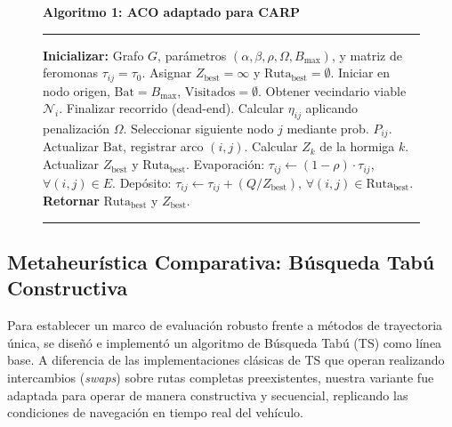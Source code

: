 \documentclass[conference]{IEEEtran}
\begin{document}
\begin{figure}[htbp]
\noindent\textbf{Algoritmo 1: ACO adaptado para CARP}
\hrule
\vspace{0.2cm}
\begin{algorithmic}[1]
\STATE \textbf{Inicializar:} Grafo $G$, parámetros $(\alpha, \beta, \rho, \Omega, B_{\text{max}})$, y matriz de feromonas $\tau_{ij} = \tau_0$.
\STATE Asignar $Z_{\text{best}} = \infty$ y $\text{Ruta}_{\text{best}} = \emptyset$.
        \STATE Iniciar en nodo origen, $\text{Bat} = B_{\text{max}}$, $\text{Visitados} = \emptyset$.
            \STATE Obtener vecindario viable $\mathcal{N}_i$.
                \STATE Finalizar recorrido (dead-end).
            \ENDIF
            \STATE Calcular $\eta_{ij}$ aplicando penalización $\Omega$.
            \STATE Seleccionar siguiente nodo $j$ mediante prob. $P_{ij}$.
            \STATE Actualizar $\text{Bat}$, registrar arco $(i,j)$.
        \ENDWHILE
        \STATE Calcular $Z_k$ de la hormiga $k$.
            \STATE Actualizar $Z_{\text{best}}$ y $\text{Ruta}_{\text{best}}$.
        \ENDIF
    \ENDFOR
    \STATE Evaporación: $\tau_{ij} \leftarrow (1 - \rho) \cdot \tau_{ij}$, $\forall (i,j) \in E$.
    \STATE Depósito: $\tau_{ij} \leftarrow \tau_{ij} + (Q / Z_{\text{best}})$, $\forall (i,j) \in \text{Ruta}_{\text{best}}$.
\ENDFOR
\STATE \textbf{Retornar} $\text{Ruta}_{\text{best}}$ y $Z_{\text{best}}$.
\end{algorithmic}
\vspace{0.1cm}
\hrule
\end{figure}

\vspace{0.2cm}

\subsection{Metaheurística Comparativa: Búsqueda Tabú Constructiva}
Para establecer un marco de evaluación robusto frente a métodos de trayectoria única, se diseñó e implementó un algoritmo de Búsqueda Tabú (TS) como línea base. A diferencia de las implementaciones clásicas de TS que operan realizando intercambios (\textit{swaps}) sobre rutas completas preexistentes, nuestra variante fue adaptada para operar de manera constructiva y secuencial, replicando las condiciones de navegación en tiempo real del vehículo.
\end{document}
